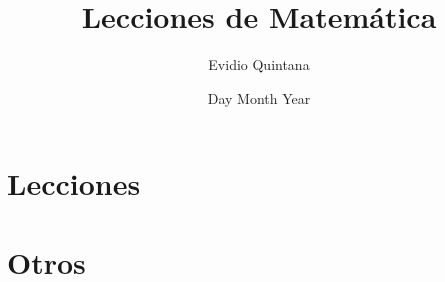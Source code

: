 \documentclass[11pt]{report}
\title{Lecciones de Matemática}
\author{Evidio Quintana}
\date{Day Month Year}
\begin{document}












\tableofcontents






% 


\chapter{Lecciones}


\chapter{Otros}

\end{document}
